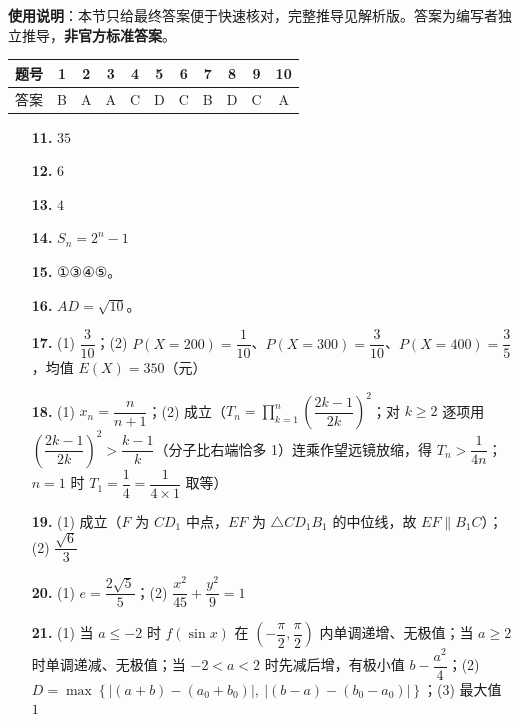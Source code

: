 
\begin{gknotice}
\textbf{使用说明}：本节只给最终答案便于快速核对，完整推导见解析版。答案为编写者独立推导，\textbf{非官方标准答案}。
\end{gknotice}

\begin{center}\begin{tabular}{ccccccccccc}
\toprule
题号 & 1 & 2 & 3 & 4 & 5 & 6 & 7 & 8 & 9 & 10 \\
\midrule
答案 & B & A & A & C & D & C & B & D & C & A \\
\bottomrule
\end{tabular}\end{center}

\begin{itemize}[leftmargin=2.6em]
  \item[\textbf{11.}] \(35\)
  \item[\textbf{12.}] \(6\)
  \item[\textbf{13.}] \(4\)
  \item[\textbf{14.}] \(S_n=2^n-1\)
  \item[\textbf{15.}] ①③④⑤。
\end{itemize}

\begin{itemize}[leftmargin=2.6em]
  \item[\textbf{16.}] \(AD=\sqrt{10}\)。
  \item[\textbf{17.}] (1) \(\dfrac{3}{10}\)；(2) \(P(X=200)=\dfrac{1}{10}\)、\(P(X=300)=\dfrac{3}{10}\)、\(P(X=400)=\dfrac{3}{5}\)，均值 \(E(X)=350\)（元）
  \item[\textbf{18.}] (1) \(x_n=\dfrac{n}{n+1}\)；(2) 成立（\(T_n=\prod_{k=1}^{n}\left(\dfrac{2k-1}{2k}\right)^2\)；对 \(k\geqslant 2\) 逐项用 \(\left(\dfrac{2k-1}{2k}\right)^2>\dfrac{k-1}{k}\)（分子比右端恰多 1）连乘作望远镜放缩，得 \(T_n>\dfrac{1}{4n}\)；\(n=1\) 时 \(T_1=\dfrac{1}{4}=\dfrac{1}{4\times 1}\) 取等）
  \item[\textbf{19.}] (1) 成立（\(F\) 为 \(CD_1\) 中点，\(EF\) 为 \(\triangle CD_1B_1\) 的中位线，故 \(EF\parallel B_1C\)）；(2) \(\dfrac{\sqrt{6}}{3}\)
  \item[\textbf{20.}] (1) \(e=\dfrac{2\sqrt{5}}{5}\)；(2) \(\dfrac{x^2}{45}+\dfrac{y^2}{9}=1\)
  \item[\textbf{21.}] (1) 当 \(a\leqslant -2\) 时 \(f(\sin x)\) 在 \(\left(-\dfrac{\pi}{2},\dfrac{\pi}{2}\right)\) 内单调递增、无极值；当 \(a\geqslant 2\) 时单调递减、无极值；当 \(-2<a<2\) 时先减后增，有极小值 \(b-\dfrac{a^2}{4}\)；(2) \(D=\max\left\{|(a+b)-(a_0+b_0)|,\ |(b-a)-(b_0-a_0)|\right\}\)；(3) 最大值 \(1\)
\end{itemize}
